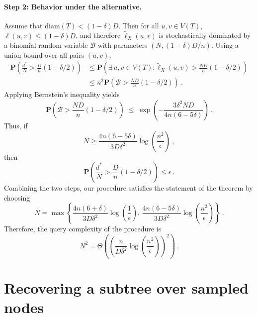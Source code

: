 \documentclass[12pt]{article}
\newcommand{\prob}[1]{\mathbf{P}\left( #1 \right)}
\newcommand{\diam}[1]{\mathrm{diam}\!\left(#1\right)}
\begin{document}
\paragraph{Step 2: Behavior under the alternative.}
Assume that $\diam{T}<(1-\delta)D$.
Then for all $u,v\in V(T)$, $\ell(u,v)\le (1-\delta)D$, and therefore
$\widetilde{\ell}_X(u,v)$ is stochastically dominated by a binomial random variable
$\mathcal{B}$ with parameters $(N,(1-\delta)D/n)$. Using a union bound over all pairs $(u,v)$,
\begin{align}
\prob{\frac{d^*}{N}>\frac{D}{n}(1-\delta/2)}
&\le
\prob{\exists\,u,v\in V(T):\widetilde{\ell}_X(u,v)>\frac{ND}{n}(1-\delta/2)} \\
&\le
n^2\prob{\mathcal{B}>\frac{ND}{n}(1-\delta/2)}~.
\end{align}
Applying Bernstein’s inequality yields
\begin{equation}
\prob{\mathcal{B}>\frac{ND}{n}(1-\delta/2)}
\;\le\;
\exp\!\left(-\frac{3\delta^2ND}{4n(6-5\delta)}\right)~.
\end{equation}
Thus, if
\[
N \ge \frac{4n(6-5\delta)}{3D\delta^2}
\log\!\left(\frac{n^2}{\epsilon}\right)~,
\]
then
\[
\prob{\frac{d^*}{N}>\frac{D}{n}(1-\delta/2)}\le \epsilon~.
\]
Combining the two steps, our procedure satisfies the statement of the theorem by choosing
\[
N = \max \left\{
    \frac{4n(6 + \delta)}{3D\delta^2} \log\!\left(\frac{1}{\epsilon}\right), \,
    \frac{4n(6 - 5\delta)}{3D\delta^2} \log\!\left(\frac{n^2}{\epsilon}\right)
\right\}~.
\]
Therefore, the query complexity of the procedure is
\[
N^2 = \Theta\!\left(
    \left(
        \frac{n}{D\delta^2}
        \log\!\left(\frac{n^2}{\epsilon}\right)
    \right)^2
\right)~.
\]



\section{Recovering a subtree over sampled nodes}
\label{sec:recover-TX}
\end{document}
